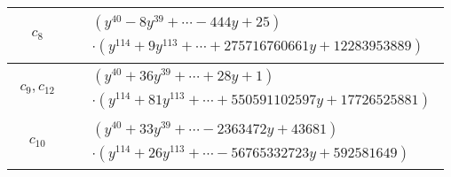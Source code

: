\documentclass[1p]{elsarticle_modified}
\theoremstyle{definition}
\begin{document}
\begin{tabular}{m{50pt}|m{274pt}}
\hline $$\begin{aligned}c_{8}\end{aligned}$$&$\begin{aligned}
&(y^{40}-8 y^{39}+\cdots-444 y+25)\\
&\cdot(y^{114}+9 y^{113}+\cdots+275716760661 y+12283953889)
\end{aligned}$\\
\hline $$\begin{aligned}c_{9},c_{12}\end{aligned}$$&$\begin{aligned}
&(y^{40}+36 y^{39}+\cdots+28 y+1)\\
&\cdot(y^{114}+81 y^{113}+\cdots+550591102597 y+17726525881)
\end{aligned}$\\
\hline $$\begin{aligned}c_{10}\end{aligned}$$&$\begin{aligned}
&(y^{40}+33 y^{39}+\cdots-2363472 y+43681)\\
&\cdot(y^{114}+26 y^{113}+\cdots-56765332723 y+592581649)
\end{aligned}$\\
\hline
\end{tabular}
\vskip 2pc
\end{document}
